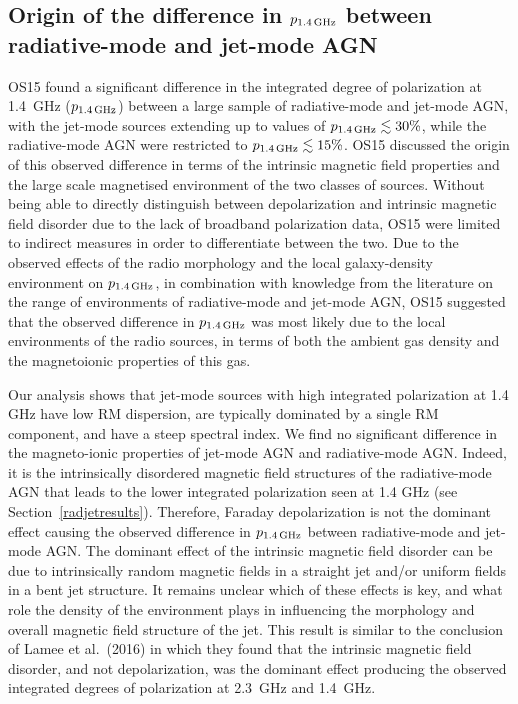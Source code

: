 \documentclass{mnras}
\begin{document}
\subsection{Origin of the difference in $p_{1.4\,{\rm GHz}}$ between radiative-mode and jet-mode AGN}
OS15 found a significant difference in the integrated degree of polarization at 1.4~GHz ($p_{1.4\,{\rm GHz}}$) between a large sample of radiative-mode and jet-mode AGN, with the jet-mode sources extending up to values of $p_{1.4\,{\rm GHz}} \lesssim 30\%$, while the radiative-mode AGN were restricted to $p_{1.4\,{\rm GHz}} \lesssim 15\%$. OS15 discussed the origin of this observed difference in terms of the intrinsic magnetic field properties and the large scale magnetised environment of the two classes of sources. Without being able to directly distinguish between depolarization and intrinsic magnetic field disorder due to the lack of broadband polarization data, OS15 were limited to indirect measures in order to differentiate between the two. Due to the observed effects of the radio morphology and the local galaxy-density environment on $p_{1.4\,{\rm GHz}}$, in combination with knowledge from the literature on the range of environments of radiative-mode and jet-mode AGN, OS15 suggested that the observed difference in $p_{1.4\,{\rm GHz}}$ was most likely due to the local environments of the radio sources, in terms of both the ambient gas density and the magnetoionic properties of this gas. 

Our analysis shows that jet-mode sources with high integrated polarization at 1.4 GHz have low RM dispersion, are typically dominated by a single RM component, and have a steep spectral index. We find no significant difference in the magneto-ionic properties of jet-mode AGN and radiative-mode AGN. Indeed, it is the intrinsically disordered magnetic field structures of the radiative-mode AGN that leads to the lower integrated polarization seen at 1.4 GHz (see Section~\ref{radjetresults}). 
Therefore, Faraday depolarization is not the dominant effect causing the observed difference in $p_{1.4\,{\rm GHz}}$ between radiative-mode and jet-mode AGN. The dominant effect of the intrinsic magnetic field disorder can be due to intrinsically random magnetic fields in a straight jet and/or uniform fields in a bent jet structure. It remains unclear which of these effects is key, and what role the density of the environment plays in influencing the morphology and overall magnetic field structure of the jet. 
This result is similar to the conclusion of Lamee et al.~(2016) in which they found that the intrinsic magnetic field disorder, and not depolarization, was the dominant effect producing the observed integrated degrees of polarization at 2.3~GHz and 1.4~GHz. 
\end{document}
